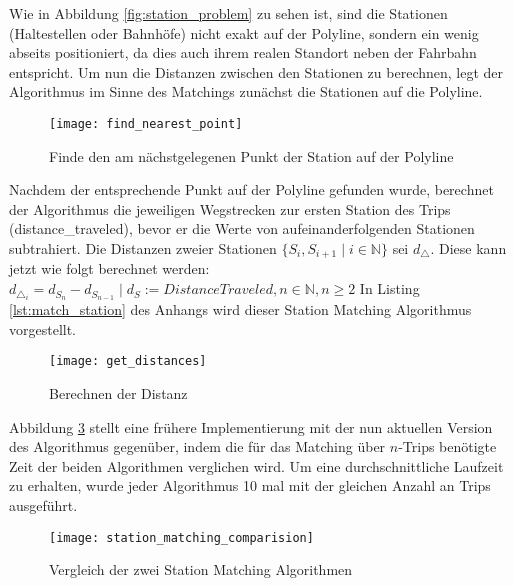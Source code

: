     Wie in Abbildung \ref{fig:station_problem} zu sehen ist, sind die Stationen (Haltestellen oder Bahnhöfe) nicht exakt auf der Polyline, sondern ein wenig abseits positioniert, da dies auch ihrem realen Standort neben der Fahrbahn entspricht. Um nun die Distanzen zwischen den Stationen zu berechnen, legt der Algorithmus im Sinne des Matchings zunächst die Stationen auf die Polyline.  

    \begin{figure}[htbp]
      \begin{center}
        \texttt{[image: find\_nearest\_point]}
        \caption{Finde den am nächstgelegenen Punkt der Station auf der Polyline}
        \label{fig:find_nearest_point}
      \end{center}
    \end{figure}

    Nachdem der entsprechende Punkt auf der Polyline gefunden wurde, berechnet der Algorithmus die jeweiligen Wegstrecken zur ersten Station des Trips (distance\_traveled), bevor er die Werte von aufeinanderfolgenden Stationen subtrahiert.  Die Distanzen zweier Stationen $\{S_i,S_{i+1} \;|\; i \in \mathbb{N} \}$ sei $d_\triangle$. Diese kann jetzt wie folgt berechnet werden: $d_{\triangle_i} = d_{S_n} - d_{S_{n-1}}\;|\; d_S := DistanceTraveled, n \in \mathbb{N}, n \ge 2$ 
    In Listing \ref{lst:match_station} des Anhangs wird dieser Station Matching Algorithmus vorgestellt.

    \begin{figure}[htbp]
      \begin{center}
        \texttt{[image: get\_distances]}
        \caption{Berechnen der Distanz}
        \label{fig:get_distances}
      \end{center}
    \end{figure}
    
    Abbildung \ref{fig:station_matching_comparision} stellt eine frühere Implementierung mit der nun aktuellen Version des Algorithmus gegenüber, indem die für das Matching über $n$-Trips benötigte Zeit der beiden Algorithmen verglichen wird. Um eine durchschnittliche Laufzeit zu erhalten, wurde jeder Algorithmus 10 mal mit der gleichen Anzahl an Trips ausgeführt.

    \begin{figure}[ht]
      \begin{center}
        \texttt{[image: station\_matching\_comparision]}
        \caption{Vergleich der zwei Station Matching Algorithmen}
        \label{fig:station_matching_comparision}
      \end{center}
    \end{figure}

